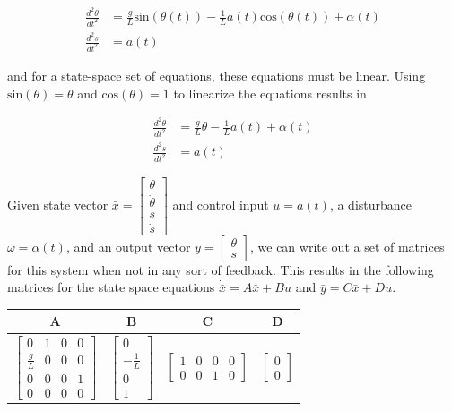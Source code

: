 \documentclass[12pt]{article}
\begin{document}
\begin{align*}
    \frac{d^{2}\theta}{dt^{2}} &= \frac{g}{L}\text{sin}(\theta(t)) - \frac{1}{L}a(t)\text{cos}(\theta(t)) + \alpha(t) \\
    \frac{d^2s}{dt^2} &= a(t)
\end{align*}

and for a state-space set of equations, these equations must be linear. Using $\text{sin}(\theta) = \theta$ and $\text{cos}(\theta) = 1$ to linearize the equations results in

\begin{align*}
    \frac{d^{2}\theta}{dt^{2}} &= \frac{g}{L}\theta - \frac{1}{L}a(t) + \alpha(t) \\
    \frac{d^2s}{dt^2} &= a(t)
\end{align*}

Given state vector $\bar{x} = \begin{bmatrix} \theta \\ \dot{\theta} \\ s \\ \dot{s} \end{bmatrix}$ and control input $u = a(t)$, a disturbance $\omega = \alpha(t)$, and an output vector $\bar{y} = \begin{bmatrix} \theta \\ s \end{bmatrix}$, we can write out a set of matrices for this system when not in any sort of feedback. This results in the following matrices for the state space equations $\dot{\bar{x}} = A\bar{x} + Bu$ and $\bar{y} = C\bar{x} + Du$.

\begin{center}
    \begin{tabular}{| c | c | c | c |}
        \hline
        A & B & C & D \\
        \hline
        $\begin{bmatrix}
                0 & 1 & 0 & 0 \\
                \frac{g}{L} & 0 & 0 & 0 \\
                0 & 0 & 0 & 1 \\
                0 & 0 & 0 & 0
             \end{bmatrix}$
        &
        $\begin{bmatrix}
                0 \\ -\frac{1}{L} \\ 0 \\ 1
             \end{bmatrix}$
        &
        $\begin{bmatrix}
                1 & 0 & 0 & 0 \\
                0 & 0 & 1 & 0
             \end{bmatrix}$
        &
        $\begin{bmatrix}
                0 \\ 0
             \end{bmatrix}$ \\
        \hline
    \end{tabular}
\end{center}
\end{document}
